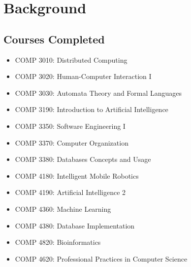 \documentclass[12pt]{article}
\begin{document}
\section*{Background}
{\small \subsection*{Courses Completed}}
\begin{itemize}
    \item COMP 3010: Distributed Computing  
    \item COMP 3020: Human-Computer Interaction I 
    \item COMP 3030: Automata Theory and Formal Languages 
    \item COMP 3190: Introduction to Artificial Intelligence 
    \item COMP 3350: Software Engineering I 
    \item COMP 3370: Computer Organization 
    \item COMP 3380: Databases Concepts and Usage 
    \item COMP 4180: Intelligent Mobile Robotics 
    \item COMP 4190: Artificial Intelligence 2 
    \item COMP 4360: Machine Learning 
    \item COMP 4380: Database Implementation 
    \item COMP 4820: Bioinformatics 
    \item COMP 4620: Professional Practices in Computer Science 
\end{itemize}
\end{document}
